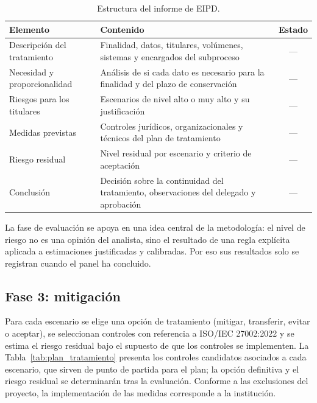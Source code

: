 \begin{table}[htbp]
  \centering
  \caption{Estructura del informe de EIPD.}
  \label{tab:eipd_sp3}
  \footnotesize
  \renewcommand{\arraystretch}{1.25}
  \begin{tabularx}{\textwidth}{|p{3.3cm}|L|c|}
    \hline
    \textbf{Elemento} & \textbf{Contenido} & \textbf{Estado} \\
    \hline
    Descripción del tratamiento & Finalidad, datos, titulares, volúmenes, sistemas y encargados del subproceso & --- \\
    \hline
    Necesidad y proporcionalidad & Análisis de si cada dato es necesario para la finalidad y del plazo de conservación & --- \\
    \hline
    Riesgos para los titulares & Escenarios de nivel alto o muy alto y su justificación & --- \\
    \hline
    Medidas previstas & Controles jurídicos, organizacionales y técnicos del plan de tratamiento & --- \\
    \hline
    Riesgo residual & Nivel residual por escenario y criterio de aceptación & --- \\
    \hline
    Conclusión & Decisión sobre la continuidad del tratamiento, observaciones del delegado y aprobación & --- \\
    \hline
  \end{tabularx}
  \raggedright
\end{table}

La fase de evaluación se apoya en una idea central de la metodología: el nivel de riesgo no es una opinión del analista, sino el resultado de una regla explícita aplicada a estimaciones justificadas y calibradas. Por eso sus resultados solo se registran cuando el panel ha concluido.

\subsection{Fase 3: mitigación}

Para cada escenario se elige una opción de tratamiento (mitigar, transferir, evitar o aceptar), se seleccionan controles con referencia a ISO/IEC 27002:2022 \cite{iso27002_2022} y se estima el riesgo residual bajo el supuesto de que los controles se implementen. La Tabla~\ref{tab:plan_tratamiento} presenta los controles candidatos asociados a cada escenario, que sirven de punto de partida para el plan; la opción definitiva y el riesgo residual se determinarán tras la evaluación. Conforme a las exclusiones del proyecto, la implementación de las medidas corresponde a la institución.

